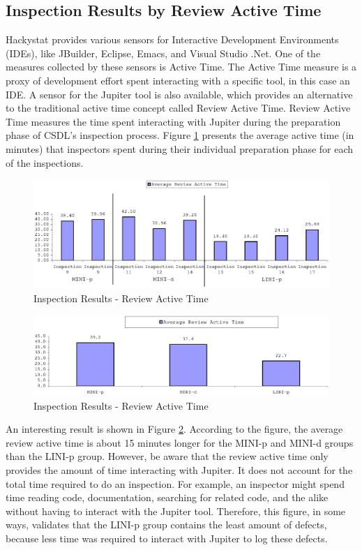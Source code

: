 \subsection{Inspection Results by Review Active Time}
Hackystat provides various sensors for Interactive Development Environments
(IDEs), like JBuilder, Eclipse, Emacs, and Visual Studio .Net. One of the
measures collected by these sensors is Active Time. The Active Time measure
is a proxy of development effort spent interacting with a specific tool, in
this case an IDE. A sensor for the Jupiter tool is also available, which
provides an alternative to the traditional active time concept called Review
Active Time. Review Active Time measures the time spent interacting with
Jupiter during the preparation phase of CSDL's inspection process. Figure
\ref{fig:inspection-results-5} presents the average active time (in
minutes) that inspectors spent during their individual preparation
phase for each of the inspections.

\begin{figure}[!h]
  \centering
  \includegraphics[width=1.0\textwidth]{figs/Results/inspection-results-5.eps}
  \caption{Inspection Results - Review Active Time}
  \label{fig:inspection-results-5}
\end{figure}

\begin{figure}[!h]
  \centering
  \includegraphics[width=1.0\textwidth]{figs/Results/inspection-results-average-4.eps}
  \caption{Inspection Results - Review Active Time}
  \label{fig:inspection-results-average-4}
\end{figure}

An interesting result is shown in Figure
\ref{fig:inspection-results-average-4}. According to the figure, the
average review active time is about 15 minutes longer for the MINI-p and
MINI-d groups than the LINI-p group. However, be aware that the review
active time only provides the amount of time interacting with Jupiter. It
does not account for the total time required to do an inspection. For
example, an inspector might spend time reading code, documentation,
searching for related code, and the alike without having to interact with
the Jupiter tool. Therefore, this figure, in some ways, validates that the
LINI-p group contains the least amount of defects, because less time was
required to interact with Jupiter to log these defects.


